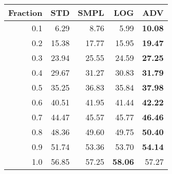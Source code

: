 \documentclass{standalone}
\begin{document}
\begin{tabular}{r|rrrr}
      \toprule
      Fraction & STD & SMPL & LOG & ADV\\
      \midrule
      0.1 & 6.29 & 8.76 & 5.99 & \textbf{10.08}\\
  0.2 & 15.38 & 17.77 & 15.95 & \textbf{19.47}\\
  0.3 & 23.94 & 25.55 & 24.59 & \textbf{27.25}\\
  0.4 & 29.67 & 31.27 & 30.83 & \textbf{31.79}\\
  0.5 & 35.25 & 36.83 & 35.84 & \textbf{37.98}\\
  0.6 & 40.51 & 41.95 & 41.44 & \textbf{42.22}\\
  0.7 & 44.47 & 45.57 & 45.77 & \textbf{46.46}\\
  0.8 & 48.36 & 49.60 & 49.75 & \textbf{50.40}\\
  0.9 & 51.74 & 53.36 & 53.70 & \textbf{54.14}\\
  1.0 & 56.85 & 57.25 & \textbf{58.06} & 57.27\\
  \bottomrule
\end{tabular}
\end{document}
